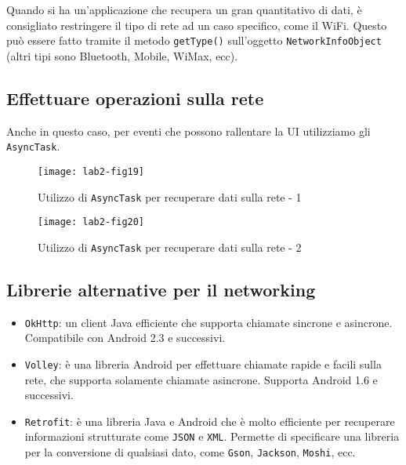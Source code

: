 Quando si ha un'applicazione che recupera un gran quantitativo di dati, è
consigliato restringere il tipo di rete ad un caso specifico, come il WiFi.
Questo può essere fatto tramite il metodo \texttt{getType()} sull'oggetto
\texttt{NetworkInfoObject} (altri tipi sono Bluetooth, Mobile, WiMax, ecc).

\subsection{Effettuare operazioni sulla rete}

Anche in questo caso, per eventi che possono rallentare la UI utilizziamo gli
\texttt{AsyncTask}.

\begin{figure}[htbp]
        \centering
        \texttt{[image: lab2-fig19]}
        \caption[AsyncTask sulla rete - 1]{Utilizzo di \texttt{AsyncTask} per
recuperare dati sulla rete - 1}
        \label{img:lab2-fig19}
\end{figure}

\begin{figure}[htbp]
        \centering
        \texttt{[image: lab2-fig20]}
        \caption[AsyncTask sulla rete - 2]{Utilizzo di \texttt{AsyncTask} per
recuperare dati sulla rete - 2}
        \label{img:lab2-fig20}
\end{figure}

\subsection{Librerie alternative per il networking}

\begin{itemize}
\item \texttt{OkHttp}: un client Java efficiente che supporta chiamate sincrone
e asincrone. Compatibile con Android 2.3 e successivi.
\item \texttt{Volley}: è una libreria Android per effettuare chiamate rapide e
facili sulla rete, che supporta solamente chiamate asincrone. Supporta Android
1.6 e successivi.
\item \texttt{Retrofit}: è una libreria Java e Android che è molto efficiente
per recuperare informazioni strutturate come \texttt{JSON} e \texttt{XML}.
Permette di specificare una libreria per la conversione di qualsiasi dato, come
\texttt{Gson}, \texttt{Jackson}, \texttt{Moshi}, ecc.
\end{itemize}
